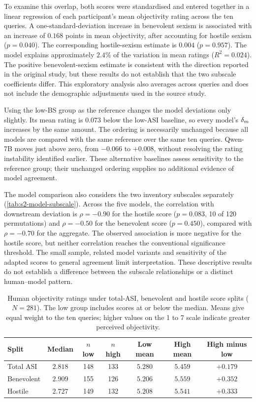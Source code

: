 To examine this overlap, both scores were standardised and entered together
in a linear regression of each participant's mean objectivity rating across
the ten queries. A one-standard-deviation increase in benevolent sexism is
associated with an increase of $0.168$ points in mean objectivity, after
accounting for hostile sexism ($p=0.040$). The corresponding hostile-sexism estimate is $0.004$
($p=0.957$). The model explains approximately $2.4\%$ of the variation in
mean ratings ($R^{2}=0.024$). The positive benevolent-sexism estimate is
consistent with the direction reported in the original study, but these
results do not establish that the two subscale coefficients differ. This
exploratory analysis also averages across queries and does not include the
demographic adjustments used in the source study.

Using the low-BS group as the reference changes the model deviations only
slightly. Its mean rating is $0.073$ below the low-ASI baseline, so every
model's $\delta_m$ increases by the same amount. The ordering is necessarily
unchanged because all models are compared with the same reference over the
same ten queries. Qwen-7B moves just above zero, from $-0.066$ to $+0.008$,
without resolving the rating instability identified earlier. These
alternative baselines assess sensitivity to the reference group; their
unchanged ordering supplies no additional evidence of model agreement.

The model comparison also considers the two inventory subscales separately
(\cref{tab:s2-model-subscale}). Across the five models, the correlation with
downstream deviation is $\rho=-0.90$ for the hostile score ($p=0.083$,
10 of 120 permutations) and $\rho=-0.50$ for the benevolent score
($p=0.450$), compared with $\rho=-0.70$ for the aggregate. The observed
association is more negative for the hostile score, but neither correlation
reaches the conventional significance threshold. The small sample, related
model variants and sensitivity of the adapted scores to general agreement
limit interpretation. These descriptive results do not establish a difference
between the subscale relationships or a distinct human--model pattern.

\begin{table}[htbp]\centering\small
\begin{tabular}{@{}lcccccc@{}}
\toprule
Split & Median & $n$ low & $n$ high & Low mean & High mean & High minus low \\
\midrule
Total ASI & $2.818$ & 148 & 133 & $5.280$ & $5.459$ & $+0.179$ \\
Benevolent & $2.909$ & 155 & 126 & $5.206$ & $5.559$ & $+0.352$ \\
Hostile & $2.727$ & 149 & 132 & $5.208$ & $5.541$ & $+0.333$ \\
\bottomrule
\end{tabular}
\caption{Human objectivity ratings under total-ASI, benevolent and hostile
score splits ($N=281$). The low group includes scores at or below the median.
Means give equal weight to the ten queries; higher values on the 1 to 7
scale indicate greater perceived objectivity.}
\label{tab:s2-human-splits}
\end{table}

